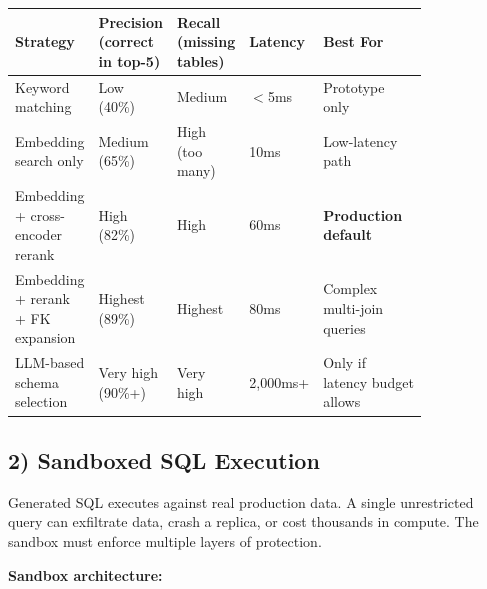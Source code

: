\begin{tabular}{|p{0.18\linewidth}|p{0.14\linewidth}|p{0.14\linewidth}|p{0.10\linewidth}|p{0.26\linewidth}|}
\hline
\textbf{Strategy} & \textbf{Precision (correct in top-5)} & \textbf{Recall (missing tables)} & \textbf{Latency} & \textbf{Best For} \\
\hline
Keyword matching & Low (40\%) & Medium & $<$5ms & Prototype only \\
\hline
Embedding search only & Medium (65\%) & High (too many) & 10ms & Low-latency path \\
\hline
Embedding + cross-encoder rerank & High (82\%) & High & 60ms & \textbf{Production default} \\
\hline
Embedding + rerank + FK expansion & Highest (89\%) & Highest & 80ms & Complex multi-join queries \\
\hline
LLM-based schema selection & Very high (90\%+) & Very high & 2,000ms+ & Only if latency budget allows \\
\hline
\end{tabular}

\subsection*{2) Sandboxed SQL Execution}

Generated SQL executes against real production data. A single unrestricted query can exfiltrate data, crash a replica, or cost thousands in compute. The sandbox must enforce multiple layers of protection.

\textbf{Sandbox architecture:}

